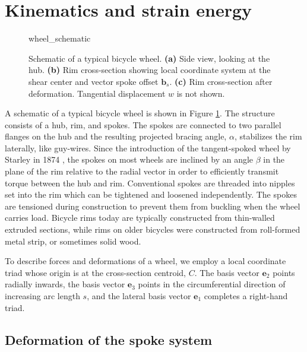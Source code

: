 \documentclass[\rootdir/thesis.tex]{subfiles}
\begin{document}
\section{Kinematics and strain energy}

\begin{figure}[b]
\centering
{wheel_schematic}
\caption{Schematic of a typical bicycle wheel. \textbf{(a)} Side view, looking at the hub. \textbf{(b)} Rim cross-section showing local coordinate system at the shear center and vector spoke offset $\mathbf{b}_s$. \textbf{(c)} Rim cross-section after deformation. Tangential displacement $w$ is not shown.}
\label{fig:wheel_schematic}
\end{figure}

A schematic of a typical bicycle wheel is shown in Figure \ref{fig:wheel_schematic}. The structure consists of a hub, rim, and spokes. The spokes are connected to two parallel flanges on the hub and the resulting projected bracing angle, $\alpha$, stabilizes the rim laterally, like guy-wires. Since the introduction of the tangent-spoked wheel by Starley in 1874 \cite{Hadland2014}, the spokes on most wheels are inclined by an angle $\beta$ in the plane of the rim relative to the radial vector in order to efficiently transmit torque between the hub and rim. Conventional spokes are threaded into nipples set into the rim which can be tightened and loosened independently. The spokes are tensioned during construction to prevent them from buckling when the wheel carries load. Bicycle rims today are typically constructed from thin-walled extruded sections, while rims on older bicycles were constructed from roll-formed metal strip, or sometimes solid wood.

To describe forces and deformations of a wheel, we employ a local coordinate triad whose origin is at the cross-section centroid, $C$. The basis vector $\mathbf{e}_2$ points radially inwards, the basis vector $\mathbf{e}_3$ points in the circumferential direction of increasing arc length $s$, and the lateral basis vector $\mathbf{e}_1$ completes a right-hand triad.



\subsection{Deformation of the spoke system}

\end{document}
